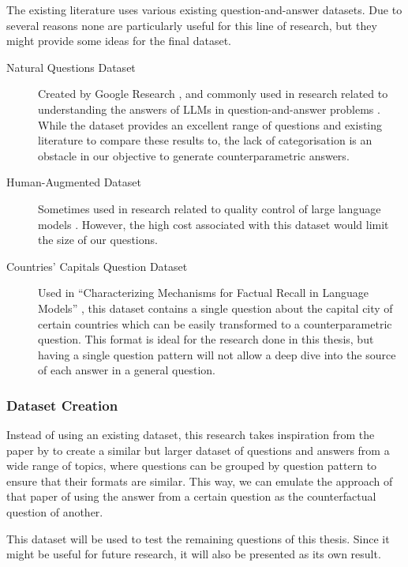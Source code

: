 The existing literature uses various existing question-and-answer datasets.
Due to several reasons none are particularly useful for this line of research, but they might provide some ideas for the final dataset.

\begin{description}
	\item[Natural Questions Dataset] Created by Google Research \citep{natural_questions}, and commonly used in research related to understanding the answers of LLMs in question-and-answer problems \citep{ragged,when_not_to_trust_llms,can_rag_models_reason}.
		While the dataset provides an excellent range of questions and existing literature to compare these results to, the lack of categorisation is an obstacle in our objective to generate counterparametric answers.
	\item[Human-Augmented Dataset] Sometimes used in research related to quality control of large language models \citep{learning_the_difference}.
		However, the high cost associated with this dataset would limit the size of our questions.
	\item[Countries' Capitals Question Dataset] Used in ``Characterizing Mechanisms for Factual Recall in Language Models'' \citep{factual_recall}, this dataset contains a single question about the capital city of certain countries which can be easily transformed to a counterparametric question.
		This format is ideal for the research done in this thesis, but having a single question pattern will not allow a deep dive into the source of each answer in a general question.
\end{description}

\subsubsection{Dataset Creation}

Instead of using an existing dataset, this research takes inspiration from the paper by \citeauthor{factual_recall} to create a similar but larger dataset of questions and answers from a wide range of topics, where questions can be grouped by question pattern to ensure that their formats are similar.
This way, we can emulate the approach of that paper of using the answer from a certain question as the counterfactual question of another.

This dataset will be used to test the remaining questions of this thesis.
Since it might be useful for future research, it will also be presented as its own result.

